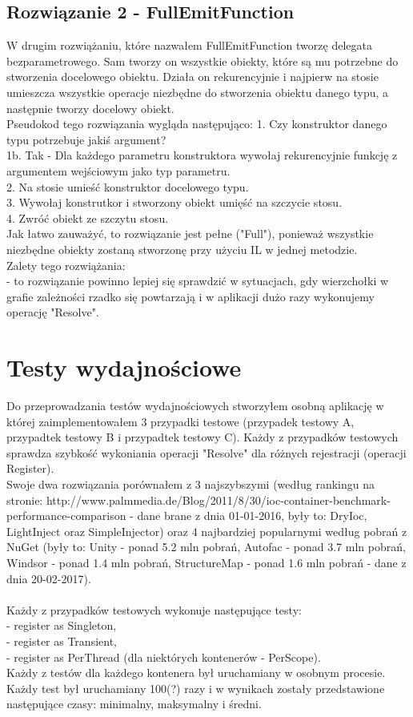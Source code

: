 \documentclass[12pt]{article}
\begin{document}
\subsection{Rozwiązanie 2 - FullEmitFunction}
W drugim rozwiążaniu, które nazwałem FullEmitFunction tworzę delegata bezparametrowego. Sam tworzy on wszystkie obiekty, które są mu potrzebne do stworzenia docelowego obiektu. Działa on rekurencyjnie i najpierw na stosie umieszcza wszystkie operacje niezbędne do stworzenia obiektu danego typu, a następnie tworzy docelowy obiekt.\\
Pseudokod tego rozwiązania wygląda następująco:
1. Czy konstruktor danego typu potrzebuje jakiś argument?\\
1b. Tak - Dla każdego parametru konstruktora wywołaj rekurencyjnie funkcję z argumentem wejściowym jako typ parametru.\\
2. Na stosie umieść konstruktor docelowego typu.\\
3. Wywołaj konstrutkor i stworzony obiekt umięść na szczycie stosu.\\
4. Zwróć obiekt ze szczytu stosu.\\
Jak łatwo zauważyć, to rozwiązanie jest pełne ("Full"), ponieważ wszystkie niezbędne obiekty zostaną stworzonę przy użyciu IL w jednej metodzie.\\
Zalety tego rozwiążania:\\
- to rozwiązanie powinno lepiej się sprawdzić w sytuacjach, gdy wierzchołki w grafie zależności rzadko się powtarzają i w aplikacji dużo razy wykonujemy operację "Resolve".



\section{Testy wydajnościowe}
Do przeprowadzania testów wydajnościowych stworzyłem osobną aplikację w której zaimplementowałem 3 przypadki testowe (przypadek testowy A, przypadtek testowy B i przypadtek testowy C). Każdy z przypadków testowych sprawdza szybkość wykoniania operacji "Resolve" dla różnych rejestracji (operacji Register).\\
Swoje dwa rozwiązania porównałem z 3 najszybszymi (według rankingu na stronie: http://www.palmmedia.de/Blog/2011/8/30/ioc-container-benchmark-performance-comparison - dane brane z dnia 01-01-2016, były to: DryIoc, LightInject oraz SimpleInjector) oraz 4 najbardziej popularnymi według pobrań z NuGet (były to: Unity - ponad 5.2 mln pobrań, Autofac - ponad 3.7 mln pobrań, Windsor - ponad 1.4 mln pobrań, StructureMap - ponad 1.6 mln pobrań - dane z dnia 20-02-2017).\\
\\
Każdy z przypadków testowych wykonuje następujące testy:\\
- register as Singleton,\\
- register as Transient,\\
- register as PerThread (dla niektórych kontenerów - PerScope).\\
Każdy z testów dla każdego kontenera był uruchamiany w osobnym procesie. Każdy test był uruchamiany 100(?) razy i w wynikach zostały przedstawione następujące czasy: minimalny,  maksymalny i średni.
\end{document}
